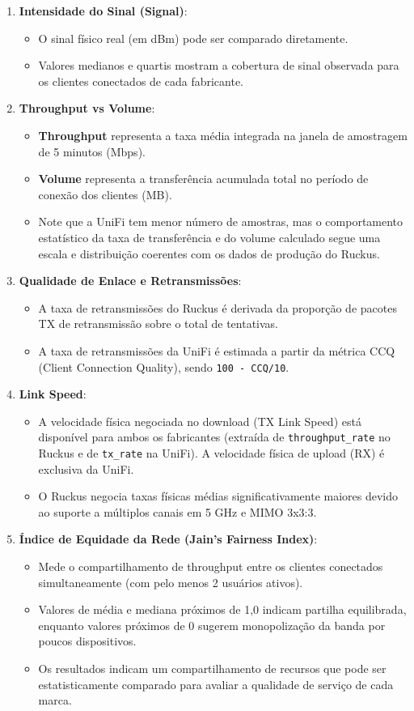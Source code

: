 \begin{enumerate}
  \item \textbf{Intensidade do Sinal (Signal)}:
  \begin{itemize}
    \item O sinal físico real (em dBm) pode ser comparado diretamente.
    \item Valores medianos e quartis mostram a cobertura de sinal observada para os clientes conectados de cada fabricante.
\end{itemize}
  \item \textbf{Throughput vs Volume}:
  \begin{itemize}
    \item \textbf{Throughput} representa a taxa média integrada na janela de amostragem de 5 minutos (Mbps).
    \item \textbf{Volume} representa a transferência acumulada total no período de conexão dos clientes (MB).
    \item Note que a UniFi tem menor número de amostras, mas o comportamento estatístico da taxa de transferência e do volume calculado segue uma escala e distribuição coerentes com os dados de produção do Ruckus.
\end{itemize}
  \item \textbf{Qualidade de Enlace e Retransmissões}:
  \begin{itemize}
    \item A taxa de retransmissões do Ruckus é derivada da proporção de pacotes TX de retransmissão sobre o total de tentativas.
    \item A taxa de retransmissões da UniFi é estimada a partir da métrica CCQ (Client Connection Quality), sendo \texttt{100 - CCQ/10}.
\end{itemize}
  \item \textbf{Link Speed}:
  \begin{itemize}
    \item A velocidade física negociada no download (TX Link Speed) está disponível para ambos os fabricantes (extraída de \texttt{throughput\_rate} no Ruckus e de \texttt{tx\_rate} na UniFi). A velocidade física de upload (RX) é exclusiva da UniFi.
    \item O Ruckus negocia taxas físicas médias significativamente maiores devido ao suporte a múltiplos canais em 5 GHz e MIMO 3x3:3.
\end{itemize}
  \item \textbf{Índice de Equidade da Rede (Jain's Fairness Index)}:
  \begin{itemize}
    \item Mede o compartilhamento de throughput entre os clientes conectados simultaneamente (com pelo menos 2 usuários ativos).
    \item Valores de média e mediana próximos de 1,0 indicam partilha equilibrada, enquanto valores próximos de 0 sugerem monopolização da banda por poucos dispositivos.
    \item Os resultados indicam um compartilhamento de recursos que pode ser estatisticamente comparado para avaliar a qualidade de serviço de cada marca.

\end{itemize}
\end{enumerate}